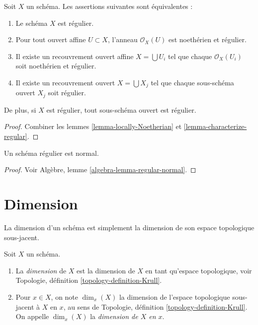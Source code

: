\begin{lemma}
\label{lemma-locally-regular}
Soit $X$ un schéma. Les assertions suivantes sont équivalentes :
\begin{enumerate}
\item Le schéma $X$ est régulier.
\item Pour tout ouvert affine $U \subset X$, l'anneau $\mathcal{O}_X(U)$
est noethérien et régulier.
\item Il existe un recouvrement ouvert affine $X = \bigcup U_i$ tel que
chaque $\mathcal{O}_X(U_i)$ soit noethérien et régulier.
\item Il existe un recouvrement ouvert $X = \bigcup X_j$
tel que chaque sous-schéma ouvert $X_j$ soit régulier.
\end{enumerate}
De plus, si $X$ est régulier, tout sous-schéma ouvert est régulier.
\end{lemma}

\begin{proof}
Combiner les lemmes \ref{lemma-locally-Noetherian}
et \ref{lemma-characterize-regular}.
\end{proof}

\begin{lemma}
\label{lemma-regular-normal}
Un schéma régulier est normal.
\end{lemma}

\begin{proof}
Voir
Algèbre, lemme \ref{algebra-lemma-regular-normal}.
\end{proof}




\section{Dimension}
\label{section-dimension}

\noindent
La dimension d'un schéma est simplement la dimension de son espace
topologique sous-jacent.

\begin{definition}
\label{definition-dimension}
Soit $X$ un schéma.
\begin{enumerate}
\item La {\it dimension} de $X$ est la dimension de $X$
en tant qu'espace topologique,
voir Topologie, définition \ref{topology-definition-Krull}.
\item Pour $x \in X$, on note $\dim_x(X)$ la dimension de l'espace
topologique sous-jacent à $X$ en $x$, au
sens de Topologie, définition \ref{topology-definition-Krull}.
On appelle $\dim_x(X)$ la {\it dimension de $X$ en $x$}.
\end{enumerate}
\end{definition}

